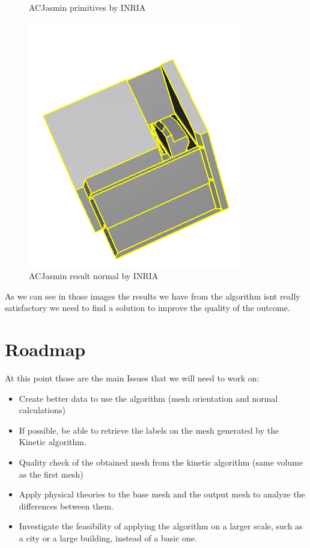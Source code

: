 \documentclass{article}
\begin{document}
\begin{figure}[H]
\begin{minipage}[t]{0.29\textwidth}
    \caption*{ACJasmin primitives by INRIA}
  \end{minipage}
  \begin{minipage}[t]{0.27\textwidth}
    \includegraphics[width=\textwidth]{../../images/screen_kinetic/ACJasmin_result_INRIA.png}
    \caption*{ACJasmin result normal by INRIA}
  \end{minipage}
\end{figure}  
As we can see in those images the results we have from the 
algorithm isnt really satisfactory we need to find a solution 
to improve the quality of the outcome.


\section{Roadmap}
At this point those are the main Issues that we will need to work on:
\begin{itemize}
  \item Create better data to use the algorithm (mesh orientation and normal calculations)
  \item If possible, be able to retrieve the labels on the mesh generated by the Kinetic algorithm.
  \item Quality check of the obtained mesh from the kinetic algorithm (same volume as the first mesh)
  \item Apply physical theories to the base mesh and the output mesh to analyze the differences between them.
  \item Investigate the feasibility of applying the algorithm on a larger scale, such as a city or a large building, instead of a basic one.
\end{itemize}
\end{document}
